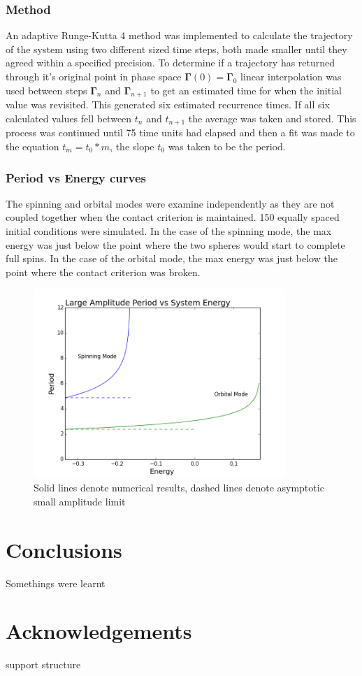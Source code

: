 \documentclass[prbg,preprint]{revtex4-1}
\begin{document}
\subsubsection{Method}
An adaptive Runge-Kutta 4 method was implemented to calculate the trajectory of the system using two different sized time steps, both made smaller until they agreed within a specified precision. To determine if a trajectory has returned through it's original point in phase space $\boldsymbol{\Gamma}(0)=\boldsymbol{\Gamma}_0$ linear interpolation was used between steps $\boldsymbol{\Gamma}_n$ and $\boldsymbol{\Gamma}_{n+1}$ to get an estimated time for when the initial value was revisited. This generated six estimated recurrence times. If all six calculated values fell between $t_n$ and $t_{n+1}$ the average was taken and stored. This process was continued until 75 time units had elapsed and then a fit was made to the equation $t_m = t_0*m$, the slope $t_0$ was taken to be the period.

\subsubsection{Period vs Energy curves}
The spinning and orbital modes were examine independently as they are not coupled together when the contact criterion is maintained. 150 equally spaced initial conditions were simulated. In the case of the spinning mode, the max energy was just below the point where the two spheres would start to complete full spins. In the case of the orbital mode, the max energy was just below the point where the contact criterion was broken.

\begin{figure}[h]
	\centering
	\includegraphics[width=0.85\textwidth]{./images/plot.png}
	\caption{Solid lines denote numerical results, dashed lines denote asymptotic small amplitude limit}
\end{figure}

\section{Conclusions}

Somethings were learnt

\section{Acknowledgements}

support structure




\end{document}
